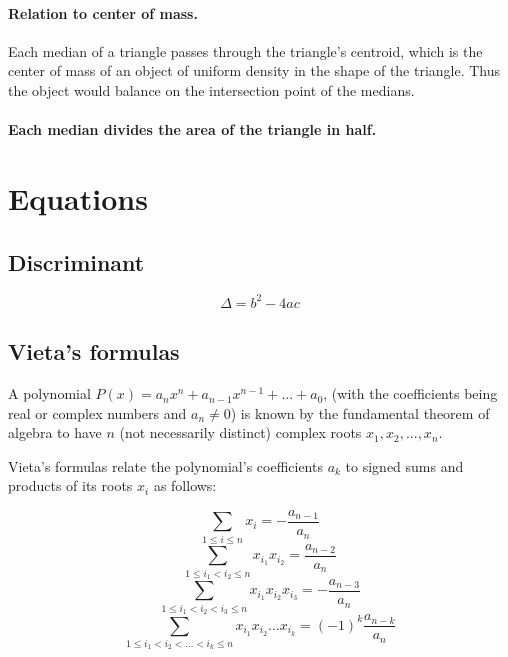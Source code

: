 \documentclass{book}
\begin{document}
\paragraph{Relation to center of mass.} Each median of a triangle passes through
the triangle's centroid, which is the center of mass of an object of uniform
density in the shape of the triangle. Thus the object would balance on the
intersection point of the medians.

\paragraph{Each median divides the area of the triangle in half.}

\section{Equations}
\subsection{Discriminant}
\[\Delta = b^2 - 4ac\]

\subsection{Vieta's formulas}
A polynomial \(P(x) = a_n x^n + a_{n-1} x^{n-1} + ... + a_0\), (with the coefficients being real or complex numbers and \(a_n \neq 0\)) is known by the fundamental theorem of algebra to have \(n\) (not necessarily distinct) complex roots \(x_1, x_2, ..., x_n\).

Vieta's formulas relate the polynomial's coefficients \(a_k\) to signed sums and products of its roots \(x_i\) as follows:

\[\sum_{1 \le i \le n} x_i = - \frac{a_{n-1}}{a_n}\]
\[\sum_{1 \le i_1 < i_2 \le n} x_{i_1} x_{i_2} = \frac{a_{n-2}}{a_n}\]
\[\sum_{1 \le i_1 < i_2 < i_3 \le n} x_{i_1} x_{i_2} x_{i_3} = - \frac{a_{n-3}}{a_n}\]
\[\sum_{1 \le i_1 < i_2 < ... < i_k \le n} x_{i_1} x_{i_2} ... x_{i_k} = (-1)^k \frac{a_{n-k}}{a_n}\]
\end{document}
